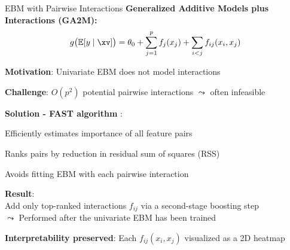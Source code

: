 \documentclass[10pt,compress,t,notes=noshow, xcolor=table]{beamer}
\begin{document}
\begin{framev}[align=top]{EBM with Pairwise Interactions}
\textbf{Generalized Additive Models plus Interactions (GA2M):}
$$
g\big(\mathbb{E}[y \mid \xv]\big) = \theta_0 + \sum_{j=1}^p f_j(x_j) + \sum_{i<j} f_{ij}(x_i, x_j)
$$
\begin{itemizeM}
\item \textbf{Motivation}: Univariate EBM does not model interactions
\item \textbf{Challenge}: $O(p^2)$ potential pairwise interactions 
$\leadsto$ often infeasible %
\item \textbf{Solution - FAST algorithm} %
:
\begin{itemizeS}
\item Efficiently estimates importance of all feature pairs
\item Ranks pairs by reduction in residual sum of squares (RSS)
\item Avoids fitting EBM with each pairwise interaction
\end{itemizeS}
\item \textbf{Result}:\\
Add only top-ranked interactions $f_{ij}$ via a second-stage boosting step\\
$\leadsto$ Performed after the univariate EBM has been trained
\item \textbf{Interpretability preserved}: Each $f_{ij}(x_i, x_j)$ visualized as a 2D heatmap
\end{itemizeM}
\end{framev}



\end{document}

